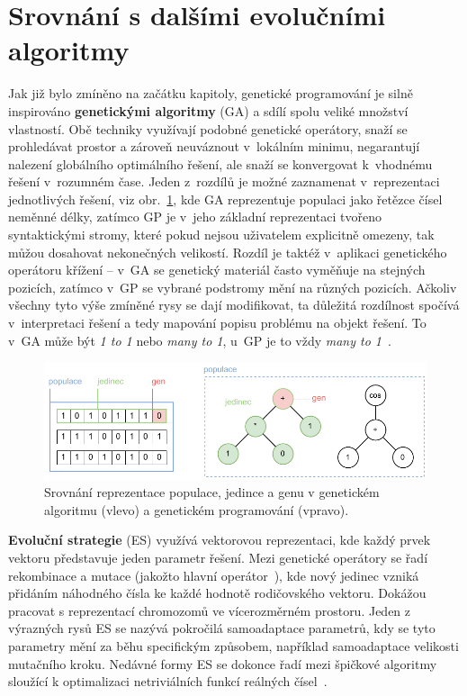 \section{Srovnání s dalšími evolučními algoritmy}
Jak již bylo zmíněno na začátku kapitoly, genetické programování je silně inspirováno \textbf{genetickými algoritmy} (GA) a sdílí spolu veliké množství vlastností. Obě techniky využívají podobné genetické operátory, snaží se prohledávat prostor a zároveň neuváznout v~lokálním minimu, negarantují nalezení globálního optimálního řešení, ale snaží se konvergovat k~vhodnému řešení v~rozumném čase. Jeden z~rozdílů je možné zaznamenat v~reprezentaci jednotlivých řešení, viz obr.~\ref{fig:ga_vs_gp}, kde GA reprezentuje populaci jako řetězce čísel neměnné délky, zatímco GP je v~jeho základní reprezentaci tvořeno syntaktickými stromy, které pokud nejsou uživatelem explicitně omezeny, tak můžou dosahovat nekonečných velikostí. Rozdíl je taktéž v~aplikaci genetického operátoru křížení -- v~GA se genetický materiál často vyměňuje na stejných pozicích, zatímco v~GP se vybrané podstromy mění na různých pozicích. Ačkoliv všechny tyto výše zmíněné rysy se dají modifikovat, ta důležitá rozdílnost spočívá v~interpretaci řešení a tedy mapování popisu problému na objekt řešení. To v~GA může být \emph{1 to 1} nebo \emph{many to 1}, u~GP je to vždy \emph{many to 1}~\cite{GAorGP}.

\begin{figure}[!h]
    \centering
    \includegraphics[scale=1]{obrazky-figures/tgp-differences-ea.pdf}
    \caption{Srovnání reprezentace populace, jedince a genu v genetickém algoritmu (vlevo) a genetickém programování (vpravo).}
    \label{fig:ga_vs_gp}
\end{figure}

\textbf{Evoluční strategie} (ES) využívá vektorovou reprezentaci, kde každý prvek vektoru představuje jeden parametr řešení. Mezi genetické operátory se řadí rekombinace a mutace (jakožto hlavní operátor~\cite{EvoFitLectures}), kde nový jedinec vzniká přidáním náhodného čísla ke každé hodnotě rodičovského vektoru. Dokážou pracovat s reprezentací chromozomů ve vícerozměrném prostoru. Jeden z výrazných rysů ES se nazývá pokročilá samoadaptace parametrů, kdy se tyto parametry mění za běhu specifickým způsobem, například samoadaptace velikosti mutačního kroku. Nedávné formy ES se dokonce řadí mezi špičkové algoritmy sloužící k optimalizaci netriviálních funkcí reálných čísel~\cite{eiben-2015B}. 


